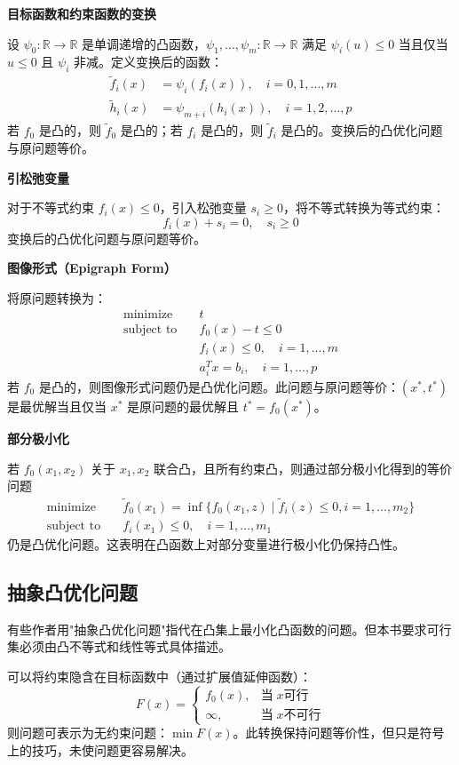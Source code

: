 \documentclass[12pt,a4paper]{book}
\begin{document}
\textbf{目标函数和约束函数的变换}

设 $\psi_0: \mathbb{R} \to \mathbb{R}$ 是单调递增的凸函数，$\psi_1,\dots,\psi_m: \mathbb{R} \to \mathbb{R}$ 满足 $\psi_i(u) \leq 0$ 当且仅当 $u \leq 0$ 且 $\psi_i$ 非减。定义变换后的函数：
\[
\begin{aligned}
\tilde{f}_i(x) &= \psi_i(f_i(x)), \quad i = 0,1,\dots,m \\
\tilde{h}_i(x) &= \psi_{m+i}(h_i(x)), \quad i = 1,2,\dots,p
\end{aligned}
\]
若 $f_0$ 是凸的，则 $\tilde{f}_0$ 是凸的；若 $f_i$ 是凸的，则 $\tilde{f}_i$ 是凸的。变换后的凸优化问题与原问题等价。

\textbf{引松弛变量}

对于不等式约束 $f_i(x) \leq 0$，引入松弛变量 $s_i \geq 0$，将不等式转换为等式约束：
\[
f_i(x) + s_i = 0, \quad s_i \geq 0
\]
变换后的凸优化问题与原问题等价。

\textbf{图像形式（Epigraph Form）}

将原问题转换为：
\[
\begin{aligned}
\text{minimize} \quad & t \\
\text{subject to} \quad & f_0(x) - t \leq 0 \\
& f_i(x) \leq 0, \quad i = 1, \dots, m \\
& a_i^T x = b_i, \quad i = 1, \dots, p
\end{aligned}
\]
若 $f_0$ 是凸的，则图像形式问题仍是凸优化问题。此问题与原问题等价：$(x^*,t^*)$ 是最优解当且仅当 $x^*$ 是原问题的最优解且 $t^* = f_0(x^*)$。

\textbf{部分极小化}

若 $f_0(x_1,x_2)$ 关于 $x_1,x_2$ 联合凸，且所有约束凸，则通过部分极小化得到的等价问题
\[
\begin{aligned}
\text{minimize} \quad & \tilde{f}_0(x_1) = \inf\{f_0(x_1,z) \mid \tilde{f}_i(z) \leq 0, i=1,\dots,m_2\} \\
\text{subject to} \quad & f_i(x_1) \leq 0, \quad i = 1, \dots, m_1
\end{aligned}
\]
仍是凸优化问题。这表明在凸函数上对部分变量进行极小化仍保持凸性。

\subsection{抽象凸优化问题}

有些作者用"抽象凸优化问题"指代在凸集上最小化凸函数的问题。但本书要求可行集必须由凸不等式和线性等式具体描述。

可以将约束隐含在目标函数中（通过扩展值延伸函数）：
\[
F(x) = \begin{cases}
f_0(x), & \text{当} \; x \text{可行} \\
\infty, & \text{当} \; x \text{不可行}
\end{cases}
\]
则问题可表示为无约束问题：$\min F(x)$。此转换保持问题等价性，但只是符号上的技巧，未使问题更容易解决。
\end{document}

